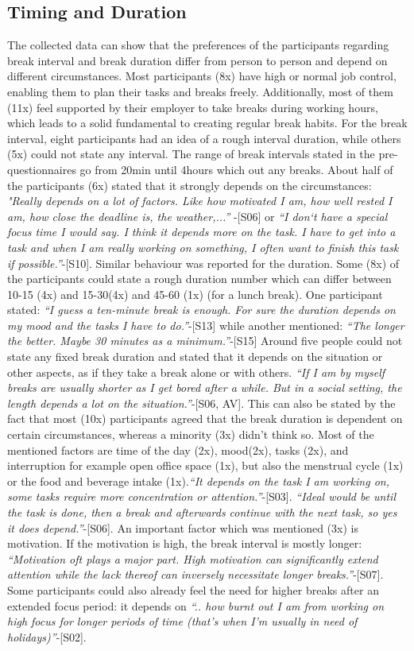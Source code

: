 \documentclass{hasel_thesis}
\begin{document}
\subsection{Timing and Duration}
The collected data can show that the preferences of the participants regarding break interval and break duration differ from person to person and depend on different circumstances. Most participants (8x) have high or normal job control, enabling them to plan their tasks and breaks freely. Additionally, most of them (11x) feel supported by their employer to take breaks during working hours, which leads to a solid fundamental to creating regular break habits. For the break interval, eight participants had an idea of a rough interval duration, while others (5x) could not state any interval. The range of break intervals stated in the pre-questionnaires go from 20min until 4hours which out any breaks. About half of the participants (6x) stated that it strongly depends on the circumstances: \textit{"Really depends on a lot of factors. Like how motivated I am, how well rested I am, how close the deadline is, the weather,...” }-[S06] or \textit{“I don‘t have a special focus time I would say. I think it depends more on the task. I have to get into a task and when I am really working on something, I often want to finish this task if possible.”}-[S10]. Similar behaviour was reported for the duration. Some (8x) of the participants could state a rough duration number which can differ between 10-15 (4x) and 15-30(4x) and  45-60 (1x) (for a lunch break). One participant stated: \textit{“I guess a ten-minute break is enough. For sure the duration depends on my mood and the tasks I have to do.”}-[S13] while another mentioned: \textit{“The longer the better. Maybe 30 minutes as a minimum.”}-[S15] Around five people could not state any fixed break duration and stated that it depends on the situation or other aspects, as if they take a break alone or with others. \textit{“If I am by myself breaks are usually shorter as I get bored after a while. But in a social setting, the length depends a lot on the situation.”}-[S06, AV]. This can also be stated by the fact that most (10x) participants agreed that the break duration is dependent on certain circumstances, whereas a minority (3x) didn't think so. Most of the mentioned factors are time of the day (2x), mood(2x), tasks (2x), and interruption for example open office space (1x), but also the menstrual cycle (1x) or the food and beverage intake (1x).\textit{“It depends on the task I am working on, some tasks require more concentration or attention.”}-[S03]. \textit{“Ideal would be until the task is done, then a break and afterwards continue with the next task, so yes it does depend.”}-[S06]. An important factor which was mentioned (3x) is motivation. If the motivation is high, the break interval is mostly longer: \textit{“Motivation oft plays a major part. High motivation can significantly extend attention while the lack thereof can inversely necessitate longer breaks.”}-[S07]. Some participants could also already feel the need for higher breaks after an extended focus period: it depends on \textit{“.. how burnt out I am from working on high focus for longer periods of time (that's when I'm usually in need of holidays)”}-[S02].
\end{document}
